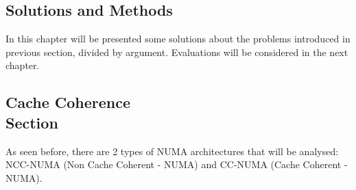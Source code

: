 \documentclass[a4paper,10pt]{article}
\begin{document}
\begin{multicols}{2}
\section{Solutions and Methods}

In this chapter will be presented some solutions about the problems introduced in previous section, divided by argument. Evaluations will be considered in the next chapter.

\subsection{Cache Coherence \\ Section}

As seen before, there are 2 types of NUMA architectures that will be analysed: NCC-NUMA (Non Cache Coherent - NUMA) and CC-NUMA (Cache Coherent - NUMA). \\

\end{multicols}
\end{document}
